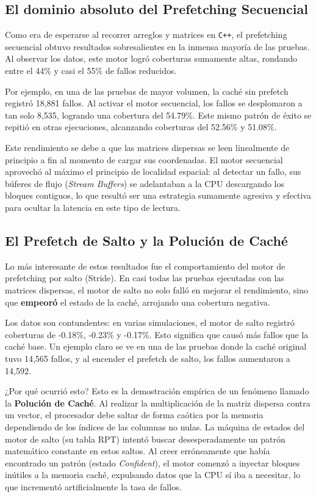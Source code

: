 \documentclass[12pt, a4paper]{article}
\begin{document}
\subsection{El dominio absoluto del Prefetching Secuencial}
Como era de esperarse al recorrer arreglos y matrices en \texttt{C++}, el prefetching secuencial obtuvo resultados sobresalientes en la inmensa mayoría de las pruebas. Al observar los datos, este motor logró coberturas sumamente altas, rondando entre el 44\% y casi el 55\% de fallos reducidos. 

Por ejemplo, en una de las pruebas de mayor volumen, la caché sin prefetch registró 18,881 fallos. Al activar el motor secuencial, los fallos se desplomaron a tan solo 8,535, logrando una cobertura del 54.79\%. Este mismo patrón de éxito se repitió en otras ejecuciones, alcanzando coberturas del 52.56\% y 51.08\%. 

Este rendimiento se debe a que las matrices dispersas se leen linealmente de principio a fin al momento de cargar sus coordenadas. El motor secuencial aprovechó al máximo el principio de localidad espacial: al detectar un fallo, sus búferes de flujo (\textit{Stream Buffers}) se adelantaban a la CPU descargando los bloques contiguos, lo que resultó ser una estrategia sumamente agresiva y efectiva para ocultar la latencia en este tipo de lectura.

\subsection{El Prefetch de Salto y la Polución de Caché}
Lo más interesante de estos resultados fue el comportamiento del motor de prefetching por salto (Stride). En casi todas las pruebas ejecutadas con las matrices dispersas, el motor de salto no solo falló en mejorar el rendimiento, sino que \textbf{empeoró} el estado de la caché, arrojando una cobertura negativa.

Los datos son contundentes: en varias simulaciones, el motor de salto registró coberturas de -0.18\%, -0.23\% y -0.17\%. Esto significa que causó más fallos que la caché base. Un ejemplo claro se ve en una de las pruebas donde la caché original tuvo 14,565 fallos, y al encender el prefetch de salto, los fallos aumentaron a 14,592. 

¿Por qué ocurrió esto? Esto es la demostración empírica de un fenómeno llamado la \textbf{Polución de Caché}. Al realizar la multiplicación de la matriz dispersa contra un vector, el procesador debe saltar de forma caótica por la memoria dependiendo de los índices de las columnas no nulas. La máquina de estados del motor de salto (su tabla RPT) intentó buscar desesperadamente un patrón matemático constante en estos saltos. Al creer erróneamente que había encontrado un patrón (estado \textit{Confident}), el motor comenzó a inyectar bloques inútiles a la memoria caché, expulsando datos que la CPU sí iba a necesitar, lo que incrementó artificialmente la tasa de fallos.
\end{document}

